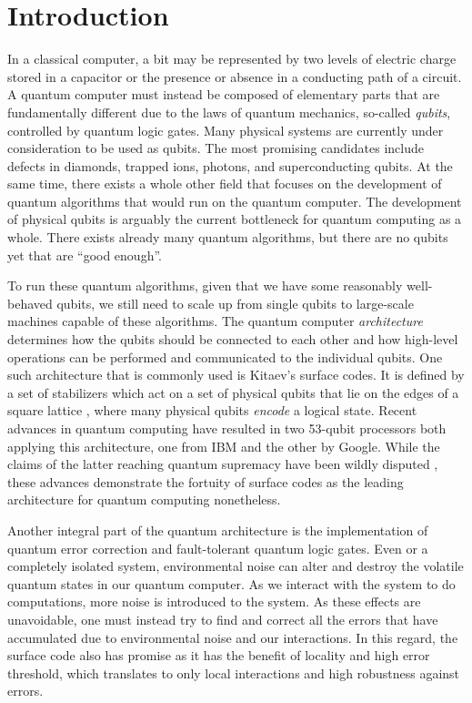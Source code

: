 \chapter{Introduction}

In a classical computer, a bit may be represented by two levels of electric charge stored in a capacitor or the presence or absence in a conducting path of a circuit. A quantum computer must instead be composed of elementary parts that are fundamentally different due to the laws of quantum mechanics, so-called \emph{qubits}, controlled by quantum logic gates. Many physical systems are currently under consideration to be used as qubits. The most promising candidates include defects in diamonds, trapped ions, photons, and superconducting qubits. At the same time, there exists a whole other field that focuses on the development of quantum algorithms that would run on the quantum computer. The development of physical qubits is arguably the current bottleneck for quantum computing as a whole. There exists already many quantum algorithms, but there are no qubits yet that are ``good enough''.

To run these quantum algorithms, given that we have some reasonably well-behaved qubits, we still need to scale up from single qubits to large-scale machines capable of these algorithms. The quantum computer \emph{architecture} determines how the qubits should be connected to each other and how high-level operations can be performed and communicated to the individual qubits. One such architecture that is commonly used is Kitaev's surface codes. It is defined by a set of stabilizers which act on a set of physical qubits that lie on the edges of a square lattice \cite{dennis2002topological, kitaev2003fault}, where many physical qubits \emph{encode} a logical state. Recent advances in quantum computing have resulted in two 53-qubit processors both applying this architecture, one from IBM and the other by Google. While the claims of the latter reaching quantum supremacy have been wildly disputed \cite{arute2019quantum}, these advances demonstrate the fortuity of surface codes as the leading architecture for quantum computing nonetheless.   

Another integral part of the quantum architecture is the implementation of quantum error correction and fault-tolerant quantum logic gates. Even or a completely isolated system, environmental noise can alter and destroy the volatile quantum states in our quantum computer. As we interact with the system to do computations, more noise is introduced to the system. As these effects are unavoidable, one must instead try to find and correct all the errors that have accumulated due to environmental noise and our interactions. In this regard, the surface code also has promise as it has the benefit of locality and high error threshold, which translates to only local interactions and high robustness against errors. 

